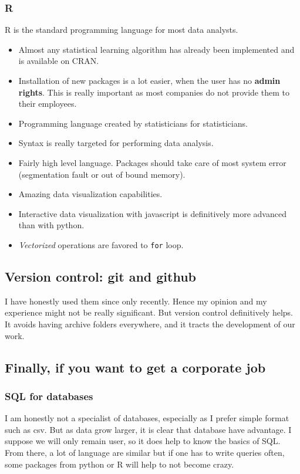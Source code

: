 \documentclass[11pt]{article}
\begin{document}
\subsubsection{R}
\label{sec:org9ae7172}
R is the standard programming language for most data analysts.
\begin{itemize}
\item Almost any statistical learning algorithm has already been implemented
and is available on CRAN.
\item Installation of new packages is a lot easier, when the user has no \textbf{admin
rights}. This is really important as most companies do not provide them
to their employees.
\item Programming language created by statisticians for statisticians.
\item Syntax is really targeted for performing data analysis.
\item Fairly high level language. Packages should take care of most system error
(segmentation fault or out of bound memory).
\item Amazing data visualization capabilities.
\item Interactive data visualization with javascript is definitively more
advanced than with python.
\item \emph{Vectorized} operations are favored to \texttt{for} loop.
\end{itemize}

\subsection{Version control: \textbf{git} and \textbf{github}}
\label{sec:org8ce5d97}
I have honestly used them since only recently. Hence my opinion and my
experience might not be really significant. But version control definitively
helps. It avoids having archive folders everywhere, and it tracts the
development of our work.
\subsection{Finally, if you want to get a corporate job}
\label{sec:org656e782}
\subsubsection{SQL for databases}
\label{sec:org3c98f41}
I am honestly not a specialist of databases, especially as I prefer simple
format such as csv. But as data grow larger, it is clear that database have
advantage. I suppose we will only remain user, so it does help to know the
basics of SQL. From there, a lot of language are similar but if one has to
write queries often, some packages from python or R will help to not
become crazy.
\end{document}
